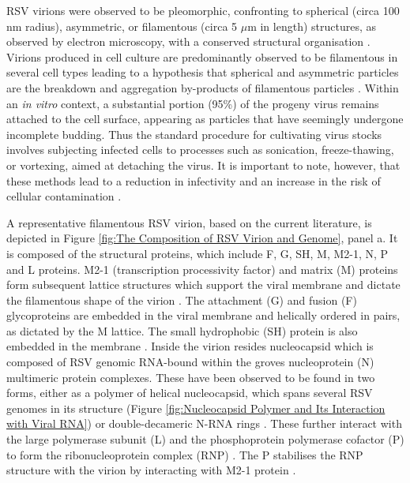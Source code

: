 RSV virions were observed to be pleomorphic, confronting to spherical (circa 100 nm radius), asymmetric, or filamentous (circa 5 \(\mu\)m in length) structures, as observed by electron microscopy, with a conserved structural organisation \cite{Kiss2014StructuralComplex}. Virions produced in cell culture are predominantly observed to be filamentous in several cell types leading to a hypothesis that spherical and asymmetric particles are the breakdown and aggregation by-products of filamentous particles \cite{Ke2018TheTomography, Conley2022HelicalVirus}. Within an \textit{in vitro} context, a substantial portion (95\%) of the progeny virus remains attached to the cell surface, appearing as particles that have seemingly undergone incomplete budding. Thus the standard procedure for cultivating virus stocks involves subjecting infected cells to processes such as sonication, freeze-thawing, or vortexing, aimed at detaching the virus. It is important to note, however, that these methods lead to a reduction in infectivity and an increase in the risk of cellular contamination \cite{Collins2013RespiratoryDisease}.

A representative filamentous RSV virion, based on the current literature, is depicted in Figure \ref{fig:The Composition of RSV Virion and Genome}, panel a. It is composed of the structural proteins, which include F, G, SH, M, M2-1, N, P and L proteins. M2-1 (transcription processivity factor) and matrix (M) proteins form subsequent lattice structures which support the viral membrane and dictate the filamentous shape of the virion \cite{Conley2022HelicalVirus}. The attachment (G) and fusion (F) glycoproteins are embedded in the viral membrane and helically ordered in pairs, as dictated by the M lattice. The small hydrophobic (SH) protein is also embedded in the membrane \cite{Ke2018TheTomography, Conley2022HelicalVirus}. Inside the virion resides nucleocapsid which is composed of RSV genomic RNA-bound within the groves nucleoprotein (N) multimeric protein complexes. These have been observed to be found in two forms, either as a polymer of helical nucleocapsid, which spans several RSV genomes in its structure (Figure \ref{fig:Nucleocapsid Polymer and Its Interaction with Viral RNA}) \cite{Tawar2009CrystalVirus, Conley2022HelicalVirus} or double-decameric N-RNA rings \cite{Gonnin2023StructuralNucleocapsids, Gonnin2022ImportanceVirus, Conley2022HelicalVirus}. These further interact with the large polymerase subunit (L) and the phosphoprotein polymerase cofactor (P) to form the ribonucleoprotein complex (RNP) \cite{Gonnin2023StructuralNucleocapsids}. The P stabilises the RNP structure with the virion by interacting with M2-1 protein \cite{Mason2003InteractionActivity}.

